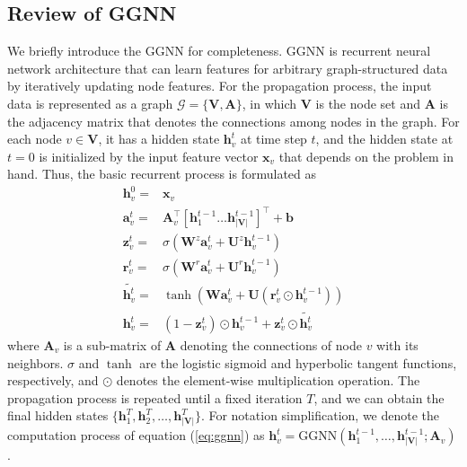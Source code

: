 \documentclass{article}
\begin{document}
\subsection{Review of GGNN}
We briefly introduce the GGNN \cite{li2015gated} for completeness. GGNN is recurrent neural network architecture that can learn features for arbitrary graph-structured data by iteratively updating node features. For the propagation process, the input data is represented as a graph $\mathcal{G}=\{\mathbf{V}, \mathbf{A}\}$, in which $\mathbf{V}$ is the node set and $\mathbf{A}$ is the adjacency matrix that denotes the connections among nodes in the graph. For each node $v\in \mathbf{V}$, it has a hidden state $\mathbf{h}_v^t$ at time step $t$, and the hidden state at $t=0$ is initialized by the input feature vector $\mathbf{x}_v$ that depends on the problem in hand. Thus, the basic recurrent process is formulated as 
\begin{equation}
   \begin{split}
    \mathbf{h}_v^0=&{}\mathbf{x}_v\\
    \mathbf{a}_v^t=&{}\mathbf{A}_v^\top[\mathbf{h}_1^{t-1} \dots \mathbf{h}_{|\mathbf{V}|}^{t-1}]^\top+\mathbf{b}\\
    \mathbf{z}_v^t=&{}\sigma(\mathbf{W}^z{\mathbf{a}_v^t}+\mathbf{U}^z{\mathbf{h}_v^{t-1}}) \\
    \mathbf{r}_v^t=&{}\sigma(\mathbf{W}^r{\mathbf{a}_v^t}+\mathbf{U}^r{\mathbf{h}_v^{t-1}}) \\
    \widetilde{\mathbf{h}_v^t}=&{}\tanh\left(\mathbf{W}{\mathbf{a}_v^t}+\mathbf{U}({\mathbf{r}_v^t}\odot{\mathbf{h}_v^{t-1}})\right) \\
    \mathbf{h}_v^t=&{}(1-{\mathbf{z}_v^t}) \odot{\mathbf{h}_v^{t-1}}+{\mathbf{z}_v^t}\odot{\widetilde{\mathbf{h}_v^t}}
   \end{split}
   \label{eq:ggnn}
\end{equation}
where $\mathbf{A}_v$ is a sub-matrix of $\mathbf{A}$ denoting the connections of node $v$ with its neighbors. $\sigma$ and $\tanh$ are the logistic sigmoid and hyperbolic tangent functions, respectively, and $\odot$ denotes the element-wise multiplication operation. The propagation process is repeated until a fixed iteration $T$, and we can obtain the final hidden states $\{\mathbf{h}_1^T, \mathbf{h}_2^T, \dots, \mathbf{h}_{|\mathbf{V}|}^T\}$. For notation simplification, we denote the computation process of equation (\ref{eq:ggnn}) as $\mathbf{h}_v^t=\mathrm{GGNN}(\mathbf{h}_1^{t-1},\dots,\mathbf{h}_{|\mathbf{V}|}^{t-1};\mathbf{A}_v)$.
\end{document}
